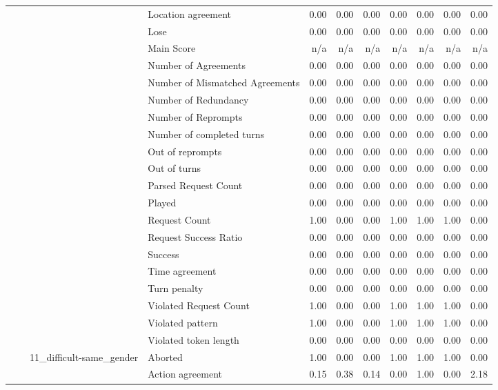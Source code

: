 \begin{tabular}{llllrrrrrrr}
 &  &  & Location agreement & 0.00 & 0.00 & 0.00 & 0.00 & 0.00 & 0.00 & 0.00 \\
 &  &  & Lose & 0.00 & 0.00 & 0.00 & 0.00 & 0.00 & 0.00 & 0.00 \\
 &  &  & Main Score & n/a & n/a & n/a & n/a & n/a & n/a & n/a \\
 &  &  & Number of Agreements & 0.00 & 0.00 & 0.00 & 0.00 & 0.00 & 0.00 & 0.00 \\
 &  &  & Number of Mismatched Agreements & 0.00 & 0.00 & 0.00 & 0.00 & 0.00 & 0.00 & 0.00 \\
 &  &  & Number of Redundancy & 0.00 & 0.00 & 0.00 & 0.00 & 0.00 & 0.00 & 0.00 \\
 &  &  & Number of Reprompts & 0.00 & 0.00 & 0.00 & 0.00 & 0.00 & 0.00 & 0.00 \\
 &  &  & Number of completed turns & 0.00 & 0.00 & 0.00 & 0.00 & 0.00 & 0.00 & 0.00 \\
 &  &  & Out of reprompts & 0.00 & 0.00 & 0.00 & 0.00 & 0.00 & 0.00 & 0.00 \\
 &  &  & Out of turns & 0.00 & 0.00 & 0.00 & 0.00 & 0.00 & 0.00 & 0.00 \\
 &  &  & Parsed Request Count & 0.00 & 0.00 & 0.00 & 0.00 & 0.00 & 0.00 & 0.00 \\
 &  &  & Played & 0.00 & 0.00 & 0.00 & 0.00 & 0.00 & 0.00 & 0.00 \\
 &  &  & Request Count & 1.00 & 0.00 & 0.00 & 1.00 & 1.00 & 1.00 & 0.00 \\
 &  &  & Request Success Ratio & 0.00 & 0.00 & 0.00 & 0.00 & 0.00 & 0.00 & 0.00 \\
 &  &  & Success & 0.00 & 0.00 & 0.00 & 0.00 & 0.00 & 0.00 & 0.00 \\
 &  &  & Time agreement & 0.00 & 0.00 & 0.00 & 0.00 & 0.00 & 0.00 & 0.00 \\
 &  &  & Turn penalty & 0.00 & 0.00 & 0.00 & 0.00 & 0.00 & 0.00 & 0.00 \\
 &  &  & Violated Request Count & 1.00 & 0.00 & 0.00 & 1.00 & 1.00 & 1.00 & 0.00 \\
 &  &  & Violated pattern & 1.00 & 0.00 & 0.00 & 1.00 & 1.00 & 1.00 & 0.00 \\
 &  &  & Violated token length & 0.00 & 0.00 & 0.00 & 0.00 & 0.00 & 0.00 & 0.00 \\
\cline{3-11}
 &  & \multirow[t]{27}{*}{11_difficult-same_gender} & Aborted & 1.00 & 0.00 & 0.00 & 1.00 & 1.00 & 1.00 & 0.00 \\
 &  &  & Action agreement & 0.15 & 0.38 & 0.14 & 0.00 & 1.00 & 0.00 & 2.18 \\

\end{tabular}
